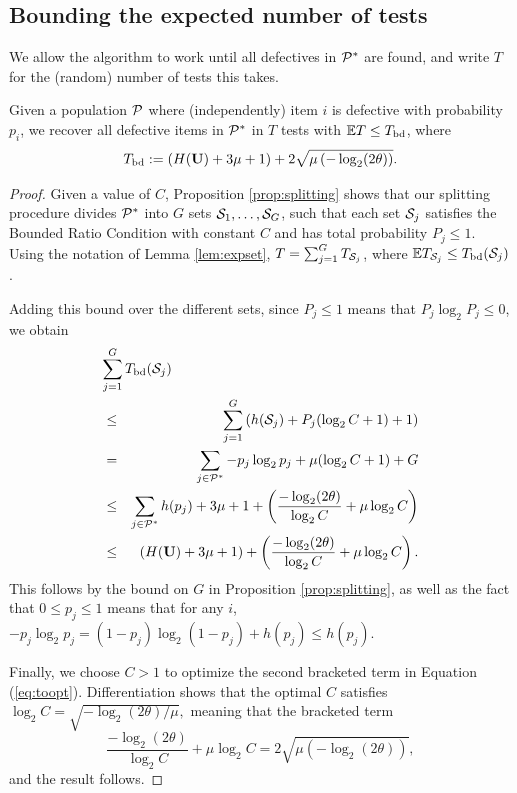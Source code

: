 \subsection{Bounding the expected number of tests} \label{sec:expectation}
%
We allow the algorithm to work until all defectives in ${\mathcal{P}}^*$ are found, and write $T$ for the (random) number of tests this takes.
%
\begin{proposition} \label{prop:overall} Given a population ${\mathcal{P}}$
where (independently) item $i$ is defective with probability $p_i$,  
we  recover  all defective items in ${\mathcal{P}}^*$ in $T$ tests with ${\mathbb{E}} T \leq T_{{\rm bd}}$, where
\begin{equation} \label{eq:tbd}
 T_{{\rm bd}} := \left( H( {\mathbf{ U}}) + 3 \mu + 1 \right) +  
 2 \sqrt{ \mu  \left( -\log_2 (2\theta) \right)}.
\end{equation}
\end{proposition}
\begin{proof} Given a value of $C$,
Proposition \ref{prop:splitting} shows that our splitting procedure divides ${\mathcal{P}}^*$ into 
$G$ sets ${\mathcal{S}}_1, \ldots, {\mathcal{S}}_G$, such that each set ${\mathcal{S}}_j$ satisfies the Bounded Ratio Condition with constant $C$ and has total probability $P_j
\leq 1$. Using the notation of Lemma \ref{lem:expset}, $T = \sum_{j=1}^G T_{{\mathcal{S}}_j}$, where 
${\mathbb{E}} T_{{\mathcal{S}}_j} \leq  T_{{\rm bd}}({\mathcal{S}}_j)$.

Adding this bound over the different sets, since $P_j \leq 1$ means that $P_j \log_2 P_j \leq 0$, we obtain
\begin{eqnarray} \label{eq:total}
\lefteqn{ \sum_{j=1}^G T_{\bd}(\setS_j) } \nonumber \\
& \leq &  \sum_{j=1}^G \left(  h(\setS_j)  + P_j (\log_2 C+1) + 1 \right) \nonumber \\
& = & \sum_{j \in \setP^*} -p_j \log_2 p_j + \mu  (\log_2 C+1) + G \nonumber \\
& \leq & \sum_{j \in \setP^*} h(p_j)  + 3 \mu  +  1 + \left( \frac{ -\log_2 (2\theta)}{\log_2 C} +  \mu  \log_2 C \right)  
\nonumber \\
& \leq & \left( H( \vc{U}) + 3 \mu + 1 \right) +   \left( \frac{ -\log_2 (2 \theta)}{\log_2 C} +  \mu \log_2 C \right).
\label{eq:toopt}
\end{eqnarray}
This follows by the bound on $G$ in Proposition \ref{prop:splitting}, as well as 
the fact that $ 0 \leq p_j \leq 1$ means that 
 for any $i$, $ - p_j \log_2 p_j =  (1-p_j) \log_2 (1-p_j) + h(p_j) \leq h(p_j)$.

Finally, we  choose $C > 1$ to optimize the  second bracketed term in Equation (\ref{eq:toopt}).
Differentiation shows that the optimal $C$ satisfies $\log_2 C = \sqrt{ -\log_2 (2 \theta)/\mu},$ meaning that
 the 
bracketed term $$
\frac{ -\log_2 (2 \theta)}{\log_2 C} +  \mu \log_2 C  =
 2 \sqrt{ \mu  \left( -\log_2 (2\theta) \right)} ,$$
and the result follows.
\end{proof}

